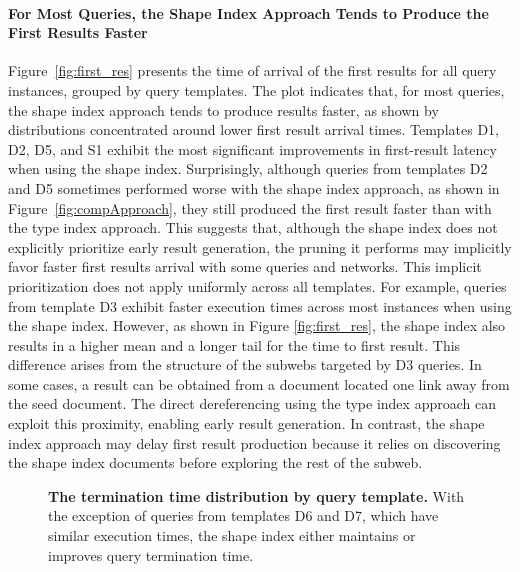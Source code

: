 \paragraph{For Most Queries, the Shape Index Approach Tends to Produce the First Results Faster}
Figure~\ref{fig:first_res} presents the time of arrival of the first results for all query instances, grouped by query templates. 
The plot indicates that, for most queries, the shape index approach tends to produce results faster, as shown by distributions concentrated around lower first result arrival times.
Templates D1, D2, D5, and S1 exhibit the most significant improvements in first-result latency when using the shape index.
Surprisingly, although queries from templates D2 and D5 sometimes performed worse with the shape index approach, as shown in Figure~\ref{fig:compApproach}, they still produced the first result faster than with the type index approach.
This suggests that, although the shape index does not explicitly prioritize early result generation, the pruning it performs may implicitly favor faster first results arrival with some queries and networks. 
This implicit prioritization does not apply uniformly across all templates. 
For example, queries from template D3 exhibit faster execution times across most instances when using the shape index.
However, as shown in Figure \ref{fig:first_res}, the shape index also results in a higher mean and a longer tail for the time to first result.
This difference arises from the structure of the subwebs targeted by D3 queries.
In some cases, a result can be obtained from a document located one link away from the seed document.
The direct dereferencing using the type index approach can exploit this proximity, enabling early result generation.
In contrast, the shape index approach may delay first result production because it relies on discovering the shape index documents before exploring the rest of the subweb.

\begin{figure}
    \centering
    
    \caption{
     \textbf{The termination time distribution by query template.}    
    With the exception of queries from templates D6 and D7, which have similar execution times, the shape index either maintains or improves query termination time.}
    \label{fig:termination_time}
\end{figure}

